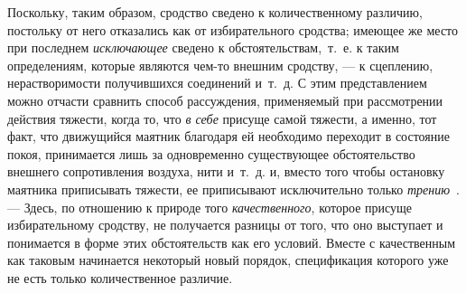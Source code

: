 Поскольку, таким образом, сродство сведено к количественному различию,
постольку от него отказались как от избирательного сродства; имеющее же
место при последнем {\em исключающее} сведено к
обстоятельствам,~т.~е. к таким определениям, которые являются чем-то
внешним сродству, — к сцеплению, нерастворимости получившихся соединений
и~т.~д. С этим представлением можно отчасти сравнить способ рассуждения,
применяемый при рассмотрении действия тяжести, когда то, что
{\em в себе} присуще самой тяжести, а именно, тот факт,
что движущийся маятник благодаря ей необходимо переходит в состояние покоя,
принимается лишь за одновременно существующее обстоятельство внешнего
сопротивления воздуха, нити и~т.~д. и, вместо того чтобы остановку маятника
приписывать тяжести, ее приписывают исключительно только
{\em трению}~.
— Здесь, по отношению к природе того
{\em качественного}, которое присуще избирательному
сродству, не получается разницы от того, что оно выступает и понимается в
форме этих обстоятельств как его условий. Вместе с качественным как таковым
начинается некоторый новый порядок, спецификация которого уже не есть
только количественное различие.

